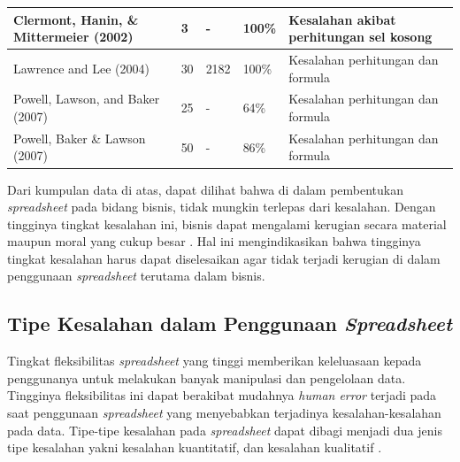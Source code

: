 \begin{small}
\begin{longtable}{ | L{3cm} | R{2cm} | R{2cm} | R{2cm} | L{3cm} | }
        Clermont, Hanin, \& Mittermeier (2002) & 3                                        & -                                  & 100\%                                 & Kesalahan akibat perhitungan sel kosong                                                \\ \hline
        Lawrence and Lee (2004)                & 30                                       & 2182                               & 100\%                                 & Kesalahan perhitungan dan formula                                                      \\ \hline
        Powell, Lawson, and Baker (2007)       & 25                                       & -                                  & 64\%                                  & Kesalahan perhitungan dan formula                                                      \\ \hline
        Powell, Baker \& Lawson (2007)         & 50                                       & -                                  & 86\%                                  & Kesalahan perhitungan dan formula                                                      \\ \hline
    \end{longtable}
\end{small}
Dari kumpulan data di atas, dapat dilihat bahwa di dalam pembentukan \textit{spreadsheet} pada bidang bisnis, tidak mungkin terlepas dari kesalahan. Dengan tingginya tingkat kesalahan ini, bisnis dapat mengalami kerugian secara material maupun moral yang cukup besar \citep{EUSPRIGHorrorStories}. Hal ini mengindikasikan bahwa tingginya tingkat kesalahan harus dapat diselesaikan agar tidak terjadi kerugian di dalam penggunaan \textit{spreadsheet} terutama dalam bisnis.

\subsection{Tipe Kesalahan dalam Penggunaan \textit{Spreadsheet}} \label{KesalahanPenggunaan}
Tingkat fleksibilitas \textit{spreadsheet} yang tinggi memberikan keleluasaan kepada penggunanya untuk melakukan banyak manipulasi dan pengelolaan data. Tingginya fleksibilitas ini dapat berakibat mudahnya \textit{human error} terjadi pada saat penggunaan \textit{spreadsheet} yang menyebabkan terjadinya kesalahan-kesalahan pada data. Tipe-tipe kesalahan pada \textit{spreadsheet} dapat dibagi menjadi dua jenis tipe kesalahan yakni kesalahan kuantitatif, dan kesalahan kualitatif \citep{Panko1998}.

